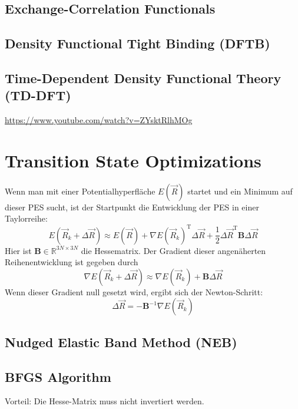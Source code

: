 \documentclass[9pt]{report}
\begin{document}
\section{Exchange-Correlation Functionals}

\section{Density Functional Tight Binding (DFTB)}

\section{Time-Dependent Density Functional Theory (TD-DFT)}
\url{https://www.youtube.com/watch?v=ZYsktRlhMOg}










\chapter{Transition State Optimizations}

Wenn man mit einer Potentialhyperfläche $E(\vec{R})$ startet und ein Minimum auf dieser PES sucht, ist der Startpunkt die Entwicklung der PES in einer Taylorreihe:
\begin{equation}
E(\vec{R}_k +\Delta\vec{R})\approx E(\vec{R})+\nabla E(\vec{R}_k)^{\mathrm{T}}\Delta\vec{R} +\frac{1}{2}\Delta\vec{R}^{\mathrm{T}}\boldsymbol{B}\Delta\vec{R}
\end{equation}
Hier ist $\boldsymbol{B}\in\mathbb{R}^{3N\times 3N}$ die Hessematrix. Der Gradient dieser angenäherten Reihenentwicklung ist gegeben durch
\begin{equation}
\nabla E(\vec{R}_k+\Delta\vec{R})\approx \nabla E(\vec{R}_k) +\boldsymbol{B}\Delta\vec{R}
\end{equation}
Wenn dieser Gradient null gesetzt wird, ergibt sich der Newton-Schritt:
\begin{equation}
\Delta\vec{R}=-\boldsymbol{B}^{-1}\nabla E(\vec{R}_k)
\end{equation}



\section{Nudged Elastic Band Method (NEB)}



\section{BFGS Algorithm}
Vorteil: Die Hesse-Matrix muss nicht invertiert werden.
\end{document}
